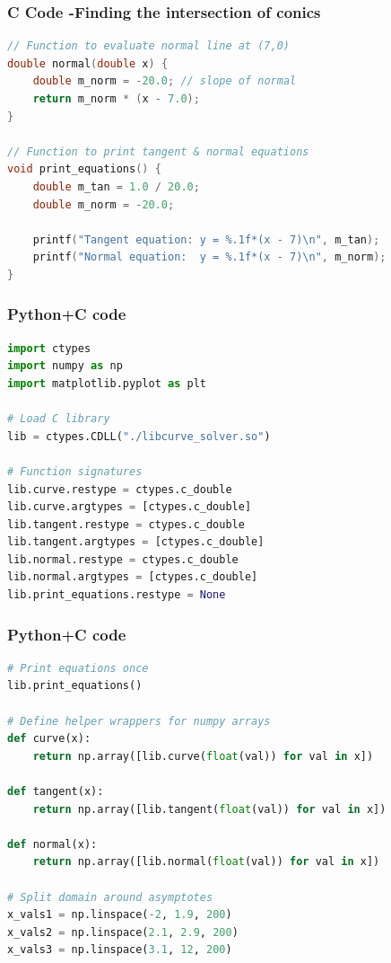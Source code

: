 \documentclass{beamer}
\begin{document}
\begin{frame}[fragile]
    \frametitle{C Code -Finding the intersection of conics}

    \begin{lstlisting}[language=C]
// Function to evaluate normal line at (7,0)
double normal(double x) {
    double m_norm = -20.0; // slope of normal
    return m_norm * (x - 7.0);
}

// Function to print tangent & normal equations
void print_equations() {
    double m_tan = 1.0 / 20.0;
    double m_norm = -20.0;

    printf("Tangent equation: y = %.1f*(x - 7)\n", m_tan);
    printf("Normal equation:  y = %.1f*(x - 7)\n", m_norm);
}
\end{lstlisting}
\end{frame}




\begin{frame}[fragile]
    \frametitle{Python+C code}

    \begin{lstlisting}[language=Python]
import ctypes
import numpy as np
import matplotlib.pyplot as plt

# Load C library
lib = ctypes.CDLL("./libcurve_solver.so")

# Function signatures
lib.curve.restype = ctypes.c_double
lib.curve.argtypes = [ctypes.c_double]
lib.tangent.restype = ctypes.c_double
lib.tangent.argtypes = [ctypes.c_double]
lib.normal.restype = ctypes.c_double
lib.normal.argtypes = [ctypes.c_double]
lib.print_equations.restype = None
    \end{lstlisting}
\end{frame}

\begin{frame}[fragile]
    \frametitle{Python+C code}

    \begin{lstlisting}[language=Python]
# Print equations once
lib.print_equations()

# Define helper wrappers for numpy arrays
def curve(x):
    return np.array([lib.curve(float(val)) for val in x])

def tangent(x):
    return np.array([lib.tangent(float(val)) for val in x])

def normal(x):
    return np.array([lib.normal(float(val)) for val in x])

# Split domain around asymptotes
x_vals1 = np.linspace(-2, 1.9, 200)
x_vals2 = np.linspace(2.1, 2.9, 200)
x_vals3 = np.linspace(3.1, 12, 200)

    \end{lstlisting}
\end{frame}
\end{document}
